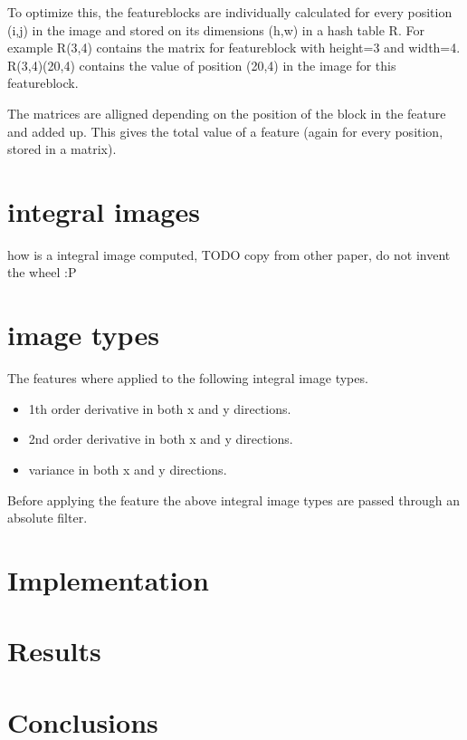 \documentclass[a4paper,11pt]{article}
\begin{document}
	To optimize this, the featureblocks are individually calculated for every
	position (i,j) in the image and stored on its dimensions (h,w) in a hash
	table R.  For example R(3,4) contains the matrix for featureblock with
	height=3 and width=4.  R(3,4)(20,4) contains the value of position (20,4) in
	the image for this featureblock.

	The matrices are alligned depending on the position of the block in the
	feature and added up. This gives the total value of a feature (again for
	every position, stored in a matrix).



\section{integral images}
how is a integral image computed, TODO copy from other paper, do not invent the
wheel :P

\section{image types}
The features where applied to the following integral image types.
\begin{itemize}
	\item{1th order derivative in both x and y directions.}
	\item{2nd order derivative in both x and y directions.}
	\item{variance in both x and y directions.}
\end{itemize}
Before applying the feature the above integral image types are passed through an absolute filter.

\section*{Implementation}

\section*{Results}

\section*{Conclusions}
\end{document}
